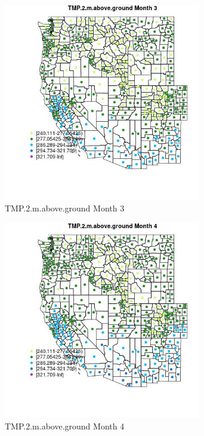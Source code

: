 \begin{figure} 
\centering  
\includegraphics[width=0.77\textwidth]{Code_Outputs/df_report_ML_predictors_CountyCentroid_Locations_Dates_2008-01-01to2018-12-31_MapObsMo3TMP2maboveground.jpg} 
\caption{\label{fig:df_report_ML_predictors_CountyCentroid_Locations_Dates_2008-01-01to2018-12-31MapObsMo3TMP2maboveground}TMP.2.m.above.ground Month 3} 
\end{figure} 
 

\begin{figure} 
\centering  
\includegraphics[width=0.77\textwidth]{Code_Outputs/df_report_ML_predictors_CountyCentroid_Locations_Dates_2008-01-01to2018-12-31_MapObsMo4TMP2maboveground.jpg} 
\caption{\label{fig:df_report_ML_predictors_CountyCentroid_Locations_Dates_2008-01-01to2018-12-31MapObsMo4TMP2maboveground}TMP.2.m.above.ground Month 4} 
\end{figure} 
 

